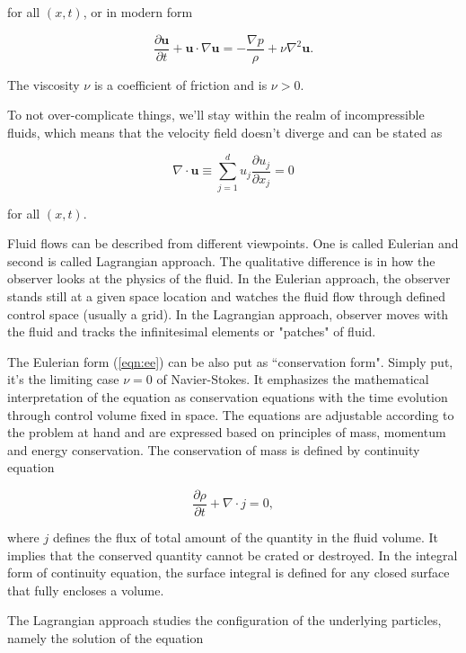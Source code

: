 for all $(x, t)$, or in modern form

\begin{equation} 
	\label{eqn:ns-modern}
	\frac{\partial \bm{u}}{\partial t} + \bm{u} \cdot \nabla \bm{u} = - \frac{\nabla p}{\rho} + \nu \nabla^2 \bm{u}.
\end{equation}

The viscosity $\nu$ is a coefficient of friction and is $\nu  > 0$.

To not over-complicate things, we'll stay within the realm of incompressible fluids, which means that the velocity field doesn't diverge and can be stated as

\begin{equation} 
	\label{eqn:div-u}
	\nabla \cdot \bm{u} \equiv \sum_{j=1}^{d} u_j \frac{\partial u_j}{\partial x_j}= 0
\end{equation}

for all $(x, t)$.

Fluid flows can be described from different viewpoints. One is called Eulerian and second is called Lagrangian approach. The qualitative difference is in how the observer looks at the physics of the fluid. In the Eulerian approach, the observer stands still at a given space location and watches the fluid flow through defined control space (usually a grid). In the Lagrangian approach, observer moves with the fluid and tracks the infinitesimal elements or "patches" of fluid.

The Eulerian form (\ref{eqn:ee}) can be also put as ``conservation form". Simply put, it's the limiting case $\nu = 0$ of Navier-Stokes. It emphasizes the mathematical interpretation of the equation as conservation equations with the time evolution through control volume fixed in space. The equations are adjustable according to the problem at hand and are expressed based on principles of mass, momentum and energy conservation. The conservation of mass is defined by continuity equation

\begin{equation}
\frac{\partial \rho}{\partial t} + \nabla \cdot j = 0,
\end{equation}

where $j$ defines the flux of total amount of the quantity in the fluid volume. It implies that the conserved quantity cannot be crated or destroyed. In the integral form of continuity equation, the surface integral is defined for any closed surface that fully encloses a volume. 

The Lagrangian approach studies the configuration of the underlying particles, namely the solution of the equation

